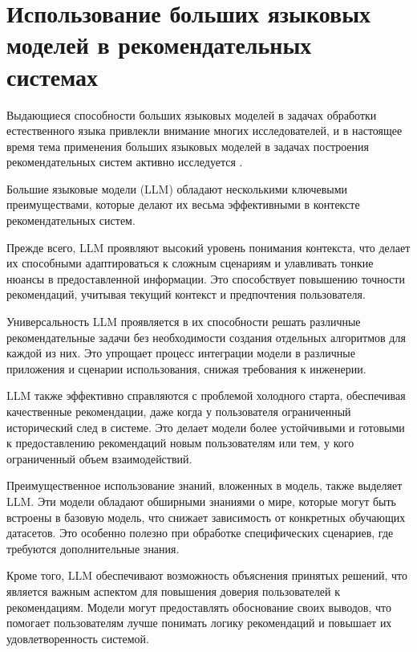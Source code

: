 \section{Использование больших языковых моделей в рекомендательных системах}

Выдающиеся способности больших языковых моделей в задачах обработки естественного языка привлекли внимание многих исследователей, и в настоящее время тема применения больших языковых моделей в задачах построения рекомендательных систем активно исследуется \cite{do_llm_undertand_preferences, llm_rs_p5, llm_rs_survey}.

Большие языковые модели (LLM) обладают несколькими ключевыми преимуществами, которые делают их весьма эффективными в контексте рекомендательных систем.

Прежде всего, LLM проявляют высокий уровень понимания контекста, что делает их способными адаптироваться к сложным сценариям и улавливать тонкие нюансы в предоставленной информации. Это способствует повышению точности рекомендаций, учитывая текущий контекст и предпочтения пользователя.

Универсальность LLM проявляется в их способности решать различные рекомендательные задачи без необходимости создания отдельных алгоритмов для каждой из них. Это упрощает процесс интеграции модели в различные приложения и сценарии использования, снижая требования к инженерии.

LLM также эффективно справляются с проблемой холодного старта, обеспечивая качественные рекомендации, даже когда у пользователя ограниченный исторический след в системе. Это делает модели более устойчивыми и готовыми к предоставлению рекомендаций новым пользователям или тем, у кого ограниченный объем взаимодействий.

Преимущественное использование знаний, вложенных в модель, также выделяет LLM. Эти модели обладают обширными знаниями о мире, которые могут быть встроены в базовую модель, что снижает зависимость от конкретных обучающих датасетов. Это особенно полезно при обработке специфических сценариев, где требуются дополнительные знания.

Кроме того, LLM обеспечивают возможность объяснения принятых решений, что является важным аспектом для повышения доверия пользователей к рекомендациям. Модели могут предоставлять обоснование своих выводов, что помогает пользователям лучше понимать логику рекомендаций и повышает их удовлетворенность системой.

